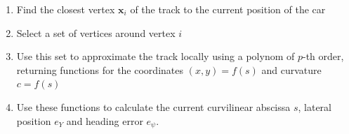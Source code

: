 \begin{enumerate}
\item Find the closest vertex $\bm{x}_i$ of the track to the current position of the car
\item Select a set of vertices around vertex $i$
\item Use this set to approximate the track locally using a polynom of $p$-th order, returning functions for the coordinates $(x,y)=f(s)$ and curvature $c=f(s)$
\item Use these functions to calculate the current curvilinear abscissa $s$, lateral position $e_Y$ and heading error $e_\psi$.
\end{enumerate}

